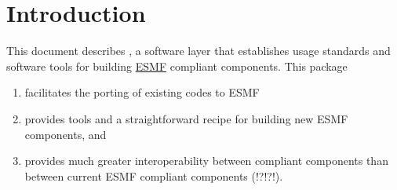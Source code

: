%  
%  
%  
\chapter{Introduction}
\minitoc
This document describes \ggn, a software layer that
establishes usage standards and software tools for building 
\href{http://www.earthsystemmodeling.org}{ESMF}
compliant components. This package
\begin{enumerate}
\item facilitates the porting of existing codes to ESMF
\item provides tools and a straightforward recipe for building new ESMF
components, and
\item provides much greater interoperability between compliant
components than between current ESMF compliant components (!?!?!).
\end{enumerate}


